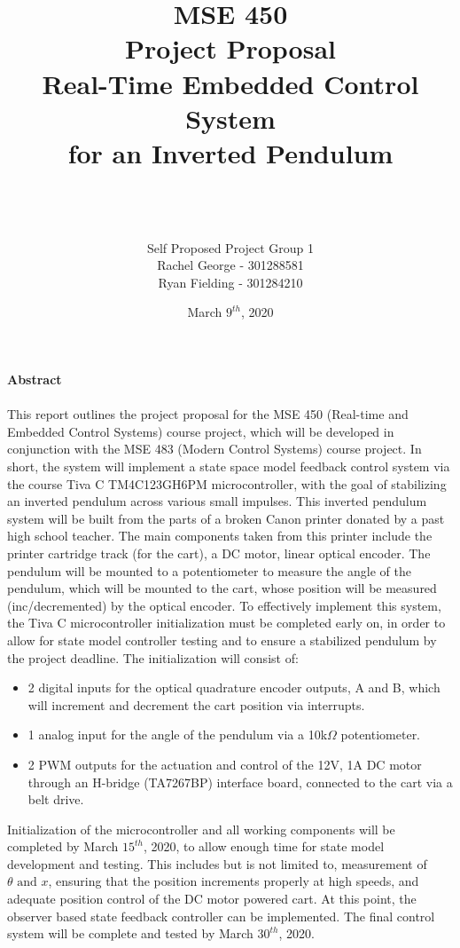 \documentclass[12pt]{article}
\title{\textbf{MSE 450\\Project Proposal\\Real-Time Embedded Control System\\ for an Inverted Pendulum}}
\author{\\ \\ \\Self Proposed Project Group 1\\ Rachel George -  301288581 \\ Ryan Fielding - 301284210}
\date{March $9^{th}$, 2020}
\begin{document}
\maketitle
\newpage

{\Large \textbf{Abstract\\\\}}
This report outlines the project proposal for the MSE 450 (Real-time and Embedded Control Systems) course project, which will be developed in conjunction with the MSE 483 (Modern Control Systems) course project. In short, the system will implement a state space model feedback control system via the course Tiva C TM4C123GH6PM microcontroller, with the goal of stabilizing an inverted pendulum across various small impulses. This inverted pendulum system will be built from the parts of a broken Canon printer donated by a past high school teacher. The main components taken from this printer include the printer cartridge track (for the cart), a DC motor, linear optical encoder. The pendulum will be mounted to a potentiometer to measure the angle of the pendulum, which will be mounted to the cart, whose position will be measured (inc/decremented) by the optical encoder. To effectively implement this system, the Tiva C microcontroller initialization must be completed early on, in order to allow for state model controller testing and to ensure a stabilized pendulum by the project deadline. The initialization will consist of:
\begin{itemize}
\item 2 digital inputs for the optical quadrature encoder outputs, A and B, which will increment and decrement the cart position via interrupts.
\item 1 analog input for the angle of the pendulum via a 10k$\Omega$ potentiometer.
\item 2 PWM outputs for the actuation and control of the 12V, 1A DC motor through an H-bridge (TA7267BP) interface board, connected to the cart via a belt drive.
\end{itemize}
Initialization of the microcontroller and all working components will be completed by March $15^{th}$, 2020, to allow enough time for state model development and testing. This includes but is not limited to, measurement of $\theta \textrm{ and } x$, ensuring that the position increments properly at high speeds, and adequate position control of the DC motor powered cart. At this point, the observer based state feedback controller can be implemented. The final control system will be complete and tested by March $30^{th}$, 2020.
\end{document}

